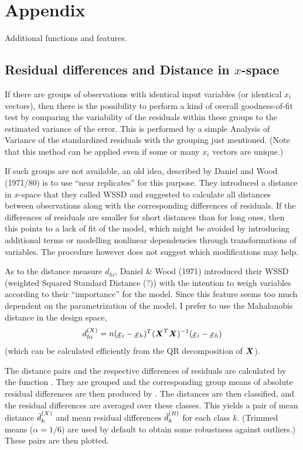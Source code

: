 \documentclass[11pt]{article}\usepackage[]{graphicx}\usepackage[]{color}
\begin{document}
\section{Appendix}
Additional functions and features.

\subsection{Residual differences and Distance in $x$-space}
If there are groups of observations with identical input variables
(or identical $x_i$ vectors), then there is the possibility to perform a kind
of overall goodness-of-fit test by comparing the variability of the
residuals within these groups to the estimated variance of the error.
This is performed by a simple Analysis of Variance of the standardized 
residuals with the grouping just mentioned. 
(Note that this method can be applied even if some or many $x_i$ vectors 
are unique.)

If such groups are not available, an old idea, described by
Daniel and Wood (1971/80) is to use ``near replicates'' for this purpose. 
They introduced a distance in $x$-space that they called WSSD and suggested
to calculate all distances between observations along with the
corresponding differences of residuals. If the differences of residuals
are smaller for short distances than for long ones, then this points to a
lack of fit of the model, which might be avoided by introducing 
additional terms or modelling nonlinear dependencies through
transformations of variables. The procedure however does not suggest
which modifications may help.

As to the distance measure $d_{hi}$, %
Daniel \& Wood (1971) introduced their 
WSSD (weighted Squared Standard Distance (?))
with the intention to weigh variables according to their ``importance'' for
the model. Since this feature seems too much dependent on the
parametrization of the model, I prefer to use the Mahalanobis distance in
the design space, 
$$
  d\sups X_{hi} = n(\vc x_i-\vc x_h)^T (\mx X^T\mx X)^{-1} (\vc x_i-\vc x_h)
$$
(which can be calculated efficiently from the QR decomposition of $\mx X$).

The distance pairs and the respective differences of residuals are
calculated by the function \Hneed{40mm}
. They are grouped and the
corresponding group means of absolute residual differences are then
produced by . 
The distances are then classified, and the residual differences
are averaged over these classes. This yields a pair of mean distance 
$\wb d\sups X_k$ and mean residual differences $\wb d\sups R_k$ 
for each class $k$. 
(Trimmed means ($\alpha=1/6$) are used by default to obtain some
robustness against outliers.)
These pairs are then plotted.
\end{document}

